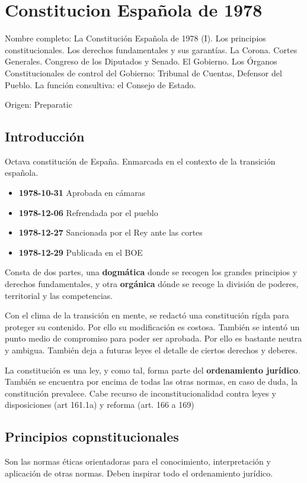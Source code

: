 \setcounter{section}{0}
\section{Constitucion Española de 1978}

Nombre completo: La Constitución Española de 1978 (I). Los principios constitucionales. Los derechos fundamentales y sus garantías. La Corona. Cortes Generales. Congreso de los Diputados y Senado. El Gobierno. Los Órganos Constitucionales de control del Gobierno: Tribunal de Cuentas, Defensor del Pueblo. La función consultiva: el Consejo de Estado.

Origen: Preparatic

\localtableofcontents

\subsection{Introducción}
    Octava constitución de España. Enmarcada en el contexto de la transición española.
    \begin{itemize}
        \item \textbf{1978-10-31} Aprobada en cámaras
        \item \textbf{1978-12-06} Refrendada por el pueblo
        \item \textbf{1978-12-27} Sancionada por el Rey ante las cortes
        \item \textbf{1978-12-29} Publicada en el BOE
    \end{itemize}

    Consta de dos partes, una \textbf{dogmática} donde se recogen los grandes principios y derechos fundamentales, y otra \textbf{orgánica} dónde se recoge la división de poderes, territorial y las competencias.

    Con el clima de la transición en mente, se redactó una constitución rígda para proteger su contenido. Por ello su modificación es costosa. También se intentó un punto medio de compromiso para poder ser aprobada. Por ello es bastante neutra y ambigua. También deja a futuras leyes el detalle de ciertos derechos y deberes.

    La constitución es una ley, y como tal, forma parte del \textbf{ordenamiento jurídico}. También se encuentra por encima de todas las otras normas, en caso de duda, la constitución prevalece. Cabe recurso de inconstitucionalidad contra leyes y disposiciones (art 161.1a) y reforma (art. 166 a 169)

\subsection{Principios copnstitucionales}
    Son las normas éticas orientadoras para el conocimiento, interpretación y aplicación de otras normas. Deben inspirar todo el ordenamiento jurídico. 

